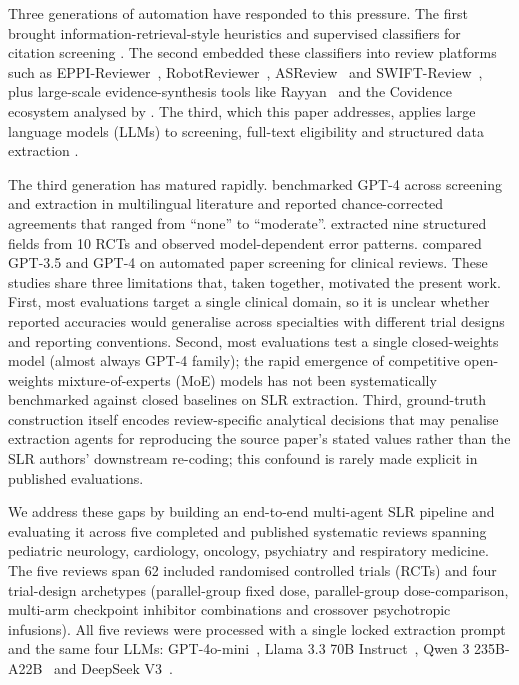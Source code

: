 \documentclass[a4paper,fleqn]{cas-sc}
\begin{document}
Three generations of automation have responded to this pressure. The first
brought information-retrieval-style heuristics and supervised
classifiers for citation screening
\citep{cohen2006reducing,wallace2010active,bannach2019machine}. The second
embedded these classifiers into review platforms such as
EPPI-Reviewer~\citep{thomas2017eppi}, RobotReviewer~\citep{marshall2017robotreviewer},
ASReview~\citep{vandeschoot2021asreview} and SWIFT-Review~\citep{howard2016swift},
plus large-scale evidence-synthesis tools like
Rayyan~\citep{ouzzani2016rayyan} and the Covidence ecosystem analysed by
\citet{harrison2020covidence,vandinter2021distillersr}. The third, which
this paper addresses, applies large language models (LLMs) to screening,
full-text eligibility and structured data extraction
\citep{khraisha2024llmsr,gartlehner2024aisr,guo2024llmsr,wang2023llmscreen,
syriani2024screening,sundaram2023automating}.

The third generation has matured rapidly. \citet{khraisha2024llmsr}
benchmarked GPT-4 across screening and extraction in multilingual
literature and reported chance-corrected agreements that ranged from
``none'' to ``moderate''. \citet{gartlehner2024aisr} extracted nine
structured fields from 10 RCTs and observed model-dependent error patterns.
\citet{guo2024llmsr} compared GPT-3.5 and GPT-4 on automated paper
screening for clinical reviews. These studies share three limitations
that, taken together, motivated the present work. First, most evaluations
target a single clinical domain, so it is unclear whether reported
accuracies would generalise across specialties with different trial
designs and reporting conventions. Second, most evaluations test a
single closed-weights model (almost always GPT-4 family); the rapid
emergence of competitive open-weights mixture-of-experts (MoE) models
\citep{grattafiori2024llama3,yang2025qwen3,deepseekv3,shazeer2017moe}
has not been systematically benchmarked against closed baselines on SLR
extraction. Third, ground-truth construction itself encodes
review-specific analytical decisions that may penalise
extraction agents for reproducing the source paper's stated values
rather than the SLR authors' downstream re-coding; this confound is rarely
made explicit in published evaluations.

We address these gaps by building an end-to-end multi-agent SLR pipeline
and evaluating it across five completed and published systematic reviews
spanning pediatric neurology, cardiology, oncology, psychiatry and
respiratory medicine. The five reviews span 62 included randomised
controlled trials (RCTs) and four trial-design archetypes (parallel-group
fixed dose, parallel-group dose-comparison, multi-arm checkpoint inhibitor
combinations and crossover psychotropic infusions). All five reviews were
processed with a single locked extraction prompt and the same four LLMs:
GPT-4o-mini~\citep{achiam2023gpt4}, Llama 3.3 70B
Instruct~\citep{grattafiori2024llama3}, Qwen 3 235B-A22B~\citep{yang2025qwen3}
and DeepSeek V3~\citep{deepseekv3}.
\end{document}
